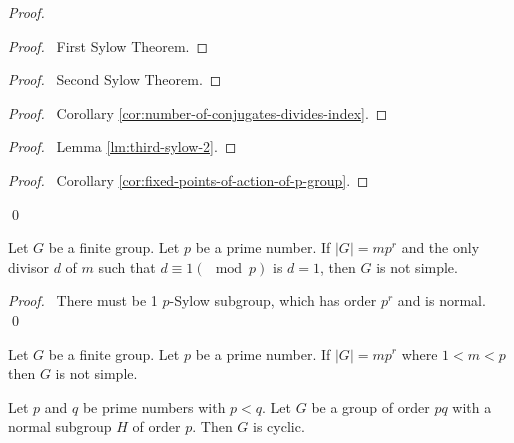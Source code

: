 \begin{proof}
\pf
{}
\begin{proof}
	\pf\ First Sylow Theorem.
\end{proof}
\begin{proof}
	\pf\ Second Sylow Theorem.
\end{proof}
\begin{proof}
	\pf\ Corollary \ref{cor:number-of-conjugates-divides-index}.
\end{proof}
\begin{proof}
	\pf\ Lemma \ref{lm:third-sylow-2}.
\end{proof}
\begin{proof}
	\pf\ Corollary \ref{cor:fixed-points-of-action-of-p-group}.
\end{proof}
\qed
\end{proof}

\begin{cor}
\label{cor:mpr-not-simple1}
Let $G$ be a finite group. Let $p$ be a prime number. If $|G| = mp^r$ and the only divisor $d$ of $m$ such that $d \equiv 1 (\mod p)$ is $d = 1$, then $G$ is not simple.
\end{cor}

\begin{proof}
\pf\ There must be 1 $p$-Sylow subgroup, which has order $p^r$ and is normal.
\qed
\end{proof}

\begin{cor}
\label{cor:mpr-not-simple}
Let $G$ be a finite group. Let $p$ be a prime number. If $|G| = mp^r$ where $1 < m < p$ then $G$ is not simple.
\end{cor}

\begin{prop}
Let $p$ and $q$ be prime numbers with $p < q$. Let $G$ be a group of order $pq$ with a normal subgroup $H$ of order $p$. Then $G$ is cyclic.
\end{prop}

